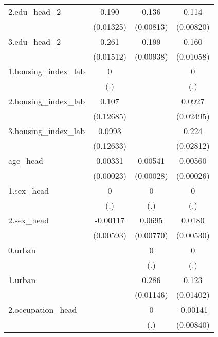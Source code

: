 \begin{table}[htbp]
{\begin{tabular}{l*{3}{c}}
2.edu_head_2&       0.190\sym{***}&       0.136\sym{***}&       0.114\sym{***}\\
            &   (0.01325)         &   (0.00813)         &   (0.00820)         \\
3.edu_head_2&       0.261\sym{***}&       0.199\sym{***}&       0.160\sym{***}\\
            &   (0.01512)         &   (0.00938)         &   (0.01058)         \\
1.housing_index_lab&           0         &                     &           0         \\
            &         (.)         &                     &         (.)         \\
2.housing_index_lab&       0.107         &                     &      0.0927\sym{***}\\
            &   (0.12685)         &                     &   (0.02495)         \\
3.housing_index_lab&      0.0993         &                     &       0.224\sym{***}\\
            &   (0.12633)         &                     &   (0.02812)         \\
age_head    &     0.00331\sym{***}&     0.00541\sym{***}&     0.00560\sym{***}\\
            &   (0.00023)         &   (0.00028)         &   (0.00026)         \\
1.sex_head  &           0         &           0         &           0         \\
            &         (.)         &         (.)         &         (.)         \\
2.sex_head  &    -0.00117         &      0.0695\sym{***}&      0.0180\sym{***}\\
            &   (0.00593)         &   (0.00770)         &   (0.00530)         \\
0.urban     &                     &           0         &           0         \\
            &                     &         (.)         &         (.)         \\
1.urban     &                     &       0.286\sym{***}&       0.123\sym{***}\\
            &                     &   (0.01146)         &   (0.01402)         \\
2.occupation_head&                     &           0         &    -0.00141         \\
            &                     &         (.)         &   (0.00840)         \\

\end{tabular}}
\end{table}

